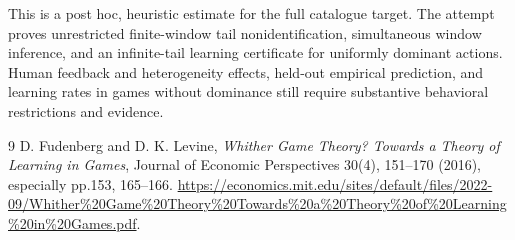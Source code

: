 \documentclass[11pt]{article}
\theoremstyle{remark}
\begin{document}
This is a post hoc, heuristic estimate for the full catalogue target.
The attempt proves unrestricted finite-window tail nonidentification, simultaneous window inference, and an infinite-tail learning certificate for uniformly dominant actions. Human feedback and heterogeneity effects, held-out empirical prediction, and learning rates in games without dominance still require substantive behavioral restrictions and evidence.

\begin{thebibliography}{9}
 D. Fudenberg and D. K. Levine, \emph{Whither Game Theory? Towards a Theory of Learning in Games}, Journal of Economic Perspectives 30(4), 151--170 (2016), especially pp.153, 165--166. \url{https://economics.mit.edu/sites/default/files/2022-09/Whither%20Game%20Theory%20Towards%20a%20Theory%20of%20Learning%20in%20Games.pdf}.
\end{thebibliography}
\end{document}
